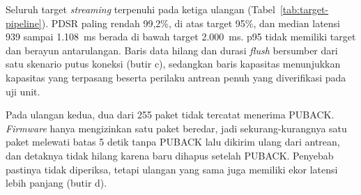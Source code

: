 
Seluruh target \textit{streaming} terpenuhi pada ketiga ulangan (Tabel~\ref{tab:target-pipeline}). PDSR paling rendah 99,2\%, di atas target 95\%, dan median latensi 939 sampai 1.108~ms berada di bawah target 2.000~ms. p95 tidak memiliki target dan berayun antarulangan. Baris data hilang dan durasi \textit{flush} bersumber dari satu skenario putus koneksi (butir c), sedangkan baris kapasitas menunjukkan kapasitas yang terpasang beserta perilaku antrean penuh yang diverifikasi pada uji unit.

Pada ulangan kedua, dua dari 255 paket tidak tercatat menerima PUBACK. \textit{Firmware} hanya mengizinkan satu paket beredar, jadi sekurang-kurangnya satu paket melewati batas 5 detik tanpa PUBACK lalu dikirim ulang dari antrean, dan detaknya tidak hilang karena baru dihapus setelah PUBACK. Penyebab pastinya tidak diperiksa, tetapi ulangan yang sama juga memiliki ekor latensi lebih panjang (butir d).


